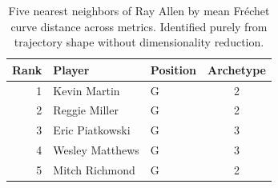 \begin{table}[htbp]
  \centering\small
  \begin{tabular}{rllc}
    \toprule
    Rank & Player & Position & Archetype \\
    \midrule
    1 & Kevin Martin & G & 2 \\
    2 & Reggie Miller & G & 2 \\
    3 & Eric Piatkowski & G & 3 \\
    4 & Wesley Matthews & G & 3 \\
    5 & Mitch Richmond & G & 2 \\
    \bottomrule
  \end{tabular}
  \caption{Five nearest neighbors of Ray Allen by mean Fr\'{e}chet curve distance across metrics. Identified purely from trajectory shape without dimensionality reduction.}
  \label{tab:Ray_Allen_frechet_curve_neighbors}
\end{table}

